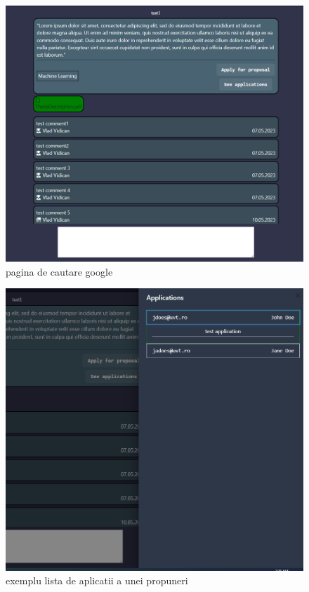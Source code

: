 \documentclass[12pt,a4paper,hidelinks]{report}
\theoremstyle{definition}
\theoremstyle{remark}
\begin{document}
\begin{figure}[H]
    \centering
    \includegraphics[scale=0.4]{images/ProposalPage.PNG}
    \caption{pagina de cautare google}
\end{figure}
\begin{figure}[H]
    \centering
    \includegraphics[scale=0.4]{images/Application.PNG}
    \caption{exemplu lista de aplicatii a unei propuneri}
\end{figure}
\end{document}
